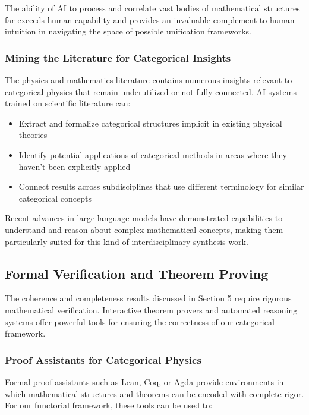 The ability of AI to process and correlate vast bodies of mathematical structures far exceeds human capability and provides an invaluable complement to human intuition in navigating the space of possible unification frameworks.

\subsubsection{Mining the Literature for Categorical Insights}

The physics and mathematics literature contains numerous insights relevant to categorical physics that remain underutilized or not fully connected. AI systems trained on scientific literature can:

\begin{itemize}
    \item Extract and formalize categorical structures implicit in existing physical theories
    \item Identify potential applications of categorical methods in areas where they haven't been explicitly applied
    \item Connect results across subdisciplines that use different terminology for similar categorical concepts
\end{itemize}

Recent advances in large language models have demonstrated capabilities to understand and reason about complex mathematical concepts, making them particularly suited for this kind of interdisciplinary synthesis work.

\subsection{Formal Verification and Theorem Proving}

The coherence and completeness results discussed in Section 5 require rigorous mathematical verification. Interactive theorem provers and automated reasoning systems offer powerful tools for ensuring the correctness of our categorical framework.

\subsubsection{Proof Assistants for Categorical Physics}

Formal proof assistants such as Lean, Coq, or Agda provide environments in which mathematical structures and theorems can be encoded with complete rigor. For our functorial framework, these tools can be used to:

